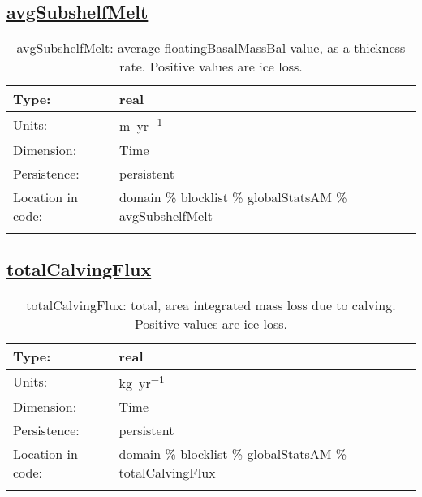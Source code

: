 \subsection[avgSubshelfMelt]{\hyperref[sec:var_tab_globalStatsAM]{avgSubshelfMelt}}
\label{subsec:var_sec_globalStatsAM_avgSubshelfMelt}
\begin{center}
\begin{longtable}{| p{2.0in} | p{4.0in} |}
        \hline 
        Type: & real \\
        \hline 
        Units: & \si{m.yr^{-1}} \\
        \hline 
        Dimension: & Time \\
        \hline 
        Persistence: & persistent \\
        \hline 
         Location in code: & domain \% blocklist \% globalStatsAM \% avgSubshelfMelt \\
         \hline 
    \caption{avgSubshelfMelt: average floatingBasalMassBal value, as a thickness rate. Positive values are ice loss.}
\end{longtable}
\end{center}
\subsection[totalCalvingFlux]{\hyperref[sec:var_tab_globalStatsAM]{totalCalvingFlux}}
\label{subsec:var_sec_globalStatsAM_totalCalvingFlux}
\begin{center}
\begin{longtable}{| p{2.0in} | p{4.0in} |}
        \hline 
        Type: & real \\
        \hline 
        Units: & \si{kg.yr^{-1}} \\
        \hline 
        Dimension: & Time \\
        \hline 
        Persistence: & persistent \\
        \hline 
         Location in code: & domain \% blocklist \% globalStatsAM \% totalCalvingFlux \\
         \hline 
    \caption{totalCalvingFlux: total, area integrated mass loss due to calving. Positive values are ice loss.}
\end{longtable}
\end{center}

